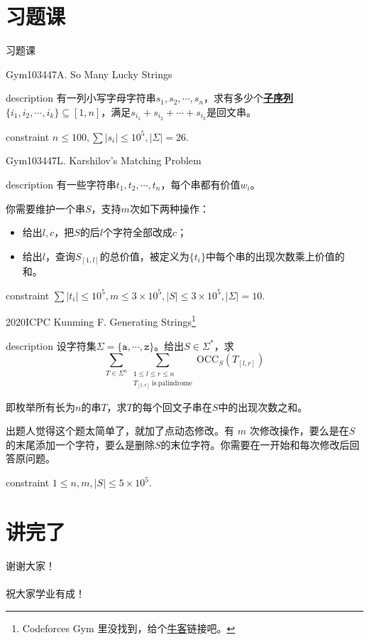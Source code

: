 \documentclass{beamer}
\theoremstyle{compact}
\def\obj#1{\textbf{\uline{#1}}}
\def\le{\leqslant}
\begin{document}
\section{习题课}
\begin{frame}
	\begin{center}
		{\huge 习题课}
	\end{center}
\end{frame}
\begin{frame}{Gym103447A. So Many Lucky Strings}
	\begin{block}{description}
		有一列小写字母字符串$s_1, s_2, \cdots, s_n$，求有多少个\obj{子序列}$\{i_1, i_2, \cdots, i_k\} \subseteq [1, n]$，满足$s_{i_1} + s_{i_2} + \cdots + s_{i_k}$是回文串。
	\end{block}
	\begin{block}{constraint}
		$n \le 100, \sum |s_i| \le 10^5, |\Sigma| = 26.$
	\end{block}
\end{frame}
\begin{frame}{Gym103447L. Karshilov's Matching Problem}
	\begin{block}{description}
		有一些字符串$t_1, t_2, \cdots, t_n$，每个串都有价值$w_i$。

		你需要维护一个串$S$，支持$m$次如下两种操作：\begin{itemize}
			\item 给出$l, c$，把$S$的后$l$个字符全部改成$c$；
			\item 给出$l$，查询$S_{[1, l]}$的总价值，被定义为$\{t_i\}$中每个串的出现次数乘上价值的和。
		\end{itemize}
	\end{block}
	\begin{block}{constraint}
		$\sum |t_i| \le 10^5, m \le 3 \times 10^5, |S| \le 3 \times 10^5, |\Sigma| = 10.$
	\end{block}
\end{frame}
\begin{frame}{2020ICPC Kunming F. Generating Strings\footnote{\tiny Codeforces Gym 里没找到，给个\href{https://ac.nowcoder.com/acm/contest/12548/F}{牛客}链接吧。}}
	\begin{block}{description}
		设字符集$\Sigma = \{\texttt{a}, \cdots, \texttt{z}\}$。给出$S \in \Sigma^*$，求$$\sum_{T \in \Sigma^n} \sum_{\substack{1 \le l \le r \le n \\ T_{[l, r]} \mathrm{\ is\ palindrome}}} \mathrm{OCC}_S(T_{[l, r]})$$

		即枚举所有长为$n$的串$T$，求$T$的每个回文子串在$S$中的出现次数之和。

		出题人觉得这个题太简单了，就加了点动态修改。有 $m$ 次修改操作，要么是在$S$的末尾添加一个字符，要么是删除$S$的末位字符。你需要在一开始和每次修改后回答原问题。
	\end{block}
	\begin{block}{constraint}
		$1 \le n, m, |S| \le 5 \times 10^5.$
	\end{block}
\end{frame}
\section{讲完了}
\begin{frame}
	\begin{center}
		{\huge 谢谢大家！\\~\\  \large 祝大家学业有成！}
	\end{center}
\end{frame}
\end{document}
